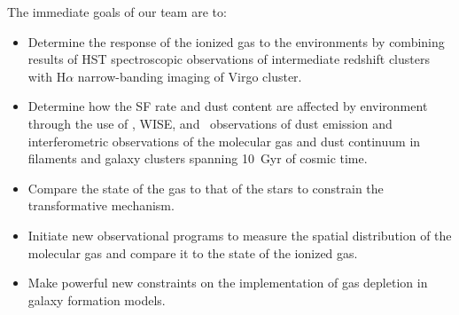 \documentclass[11pt]{article}
\begin{document}
The immediate goals of our team are to:
\vspace{-0.15in}
\begin{itemize}
\item Determine the response of the ionized gas to the environments by
  combining results of HST spectroscopic observations of intermediate redshift
   clusters with H$\alpha$ narrow-banding imaging of Virgo cluster.
\vspace{-0.1in}
\item Determine how the SF rate and dust content are
  affected by environment through the use of \spitzer, WISE, and \herschel\ observations of
  dust emission and  interferometric observations of
  the molecular gas and dust continuum in filaments and galaxy clusters spanning 10~Gyr of
  cosmic time.
\vspace{-0.1in}
\item Compare the state of the gas to that of the stars to constrain
  the transformative mechanism.
\vspace{-0.1in}
\item Initiate new observational programs to measure the spatial distribution of the
  molecular gas and compare it to the state of the ionized gas.
\vspace{-0.1in}
\item Make powerful new constraints on the implementation of gas
  depletion in galaxy formation models.
\end{itemize}
\vspace{-0.1in}


\newpage
\end{document}
